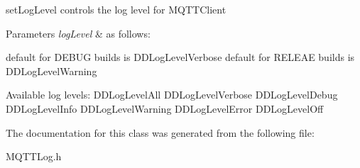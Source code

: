 set\+Log\+Level controls the log level for M\+Q\+T\+T\+Client 
\begin{DoxyParams}{Parameters}
{\em log\+Level} & as follows\+:\\
\hline
\end{DoxyParams}
default for D\+E\+B\+UG builds is D\+D\+Log\+Level\+Verbose default for R\+E\+L\+E\+AE builds is D\+D\+Log\+Level\+Warning

Available log levels\+: D\+D\+Log\+Level\+All D\+D\+Log\+Level\+Verbose D\+D\+Log\+Level\+Debug D\+D\+Log\+Level\+Info D\+D\+Log\+Level\+Warning D\+D\+Log\+Level\+Error D\+D\+Log\+Level\+Off 

The documentation for this class was generated from the following file\+:\begin{DoxyCompactItemize}
\item 
M\+Q\+T\+T\+Log.\+h\end{DoxyCompactItemize}
